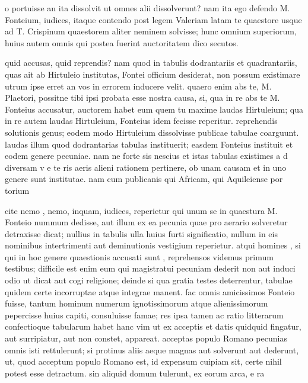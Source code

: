 
 o portuisse an ita dissolvit ut omnes alii dissolverunt? nam ita ego defendo M. Fonteium, iudices, itaque contendo post legem Valeriam latam te quaestore usque ad T. Crispinum quaestorem aliter neminem solvisse; hunc omnium superiorum, huius autem omnis qui postea fuerint auctoritatem dico secutos.

 quid accusas, quid reprendis? nam quod in tabulis dodrantariis et quadrantariis, quas ait ab Hirtuleio institutas, Fontei officium desiderat, non possum existimare utrum ipse erret an vos in errorem inducere velit. quaero enim abs te, M. Plaetori, possitne tibi ipsi probata esse nostra causa, si, qua in re abs te M. Fonteius accusatur, auctorem habet eum quem tu maxime laudas Hirtuleium; qua in re autem laudas Hirtuleium, Fonteius idem fecisse reperitur. reprehendis solutionis genus; eodem modo Hirtuleium dissolvisse publicae tabulae coarguunt. laudas illum quod dodrantarias tabulas instituerit; easdem Fonteius instituit et eodem genere pecuniae. nam ne forte sis nescius et istas tabulas existimes a d diversam v e te ris aeris alieni rationem pertinere, ob unam causam et in uno genere sunt institutae. nam cum publicanis qui Africam, qui Aquileiense por torium

 cite nemo , nemo, inquam, iudices, reperietur qui unum se in quaestura M. Fonteio nummum dedisse, aut illum ex ea pecunia quae pro aerario solveretur detraxisse dicat; nullius in tabulis ulla huius furti significatio, nullum in eis nominibus intertrimenti aut deminutionis vestigium reperietur. atqui homines , si qui in hoc genere quaestionis accusati sunt , reprehensos videmus primum testibus; difficile est enim eum qui magistratui pecuniam dederit non aut induci odio ut dicat aut cogi religione; deinde si qua gratia testes deterrentur, tabulae quidem certe incorruptae atque integrae manent. fac omnis amicissimos Fonteio fuisse, tantum hominum numerum ignotissimorum atque alienissimorum pepercisse huius capiti, consuluisse famae; res ipsa tamen ac ratio litterarum confectioque tabularum habet hanc vim ut ex acceptis et datis quidquid fingatur, aut surripiatur, aut non constet, appareat. acceptas populo Romano pecunias omnis isti rettulerunt; si protinus aliis aeque magnas aut solverunt aut dederunt, ut, quod acceptum populo Romano est, id expensum cuipiam sit, certe nihil potest esse detractum. sin aliquid domum tulerunt, ex eorum arca, e ra

